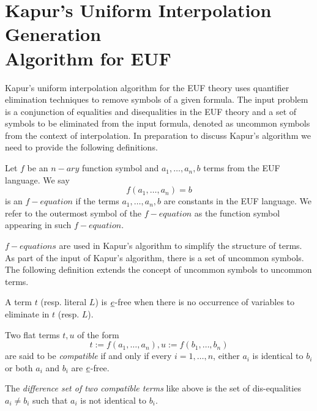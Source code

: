 \section{Kapur's Uniform Interpolation Generation \\ 
Algorithm for EUF}

Kapur's uniform interpolation algorithm for the 
EUF theory uses quantifier elimination
techniques to remove symbols of a given formula.
The input problem is a conjunction 
of equalities and disequalities in the
EUF theory and a set of symbols to be eliminated from the 
input formula, denoted
as uncommon symbols from the context of interpolation.
In preparation to discuss Kapur's algorithm we need to 
provide the 
following definitions.

\begin{definition} 
  Let $f$ be an $n-ary$ function symbol and $a_1, \dots, a_n,
  b$ terms from the EUF language. We say 
  \begin{equation*}
    f(a_1, \dots, a_n) = b
  \end{equation*}
  is an $f-equation$ if the terms $a_1, \dots, a_n, b$ are constants in
  the EUF language. We refer to the 
  outermost symbol of the $f-equation$
  as the function symbol appearing in such $f-equation$.
\end{definition}

$f-equations$ are used in Kapur's algorithm to simplify the 
structure of terms. 
As part of the input of Kapur's algorithm, there is a set
of uncommon symbols. The following definition extends 
the concept of uncommon symbols to uncommon terms.

\begin{definition}
  A term $t$ (resp. literal $L$) is $\underline{e}$-free 
  when there is no occurrence
  of variables to eliminate in $t$ (resp. $L$).

  Two flat terms $t, u$ of the form 
  \begin{equation*}
    t := f(a_1, \dots, a_n), u := f(b_1, \dots, b_n)
  \end{equation*}
  are said to be \emph{compatible} if and only if every $i = 1, \dots, n$, either
  $a_i$ is identical to $b_i$ or both $a_i$ and $b_i$ are $\underline{e}$-free.

  The \emph{difference set of two compatible terms} like 
  above is the
  set of dis-equalities $a_i \neq b_i$ such that 
  $a_i$ is not identical
  to $b_i$.
\end{definition}




